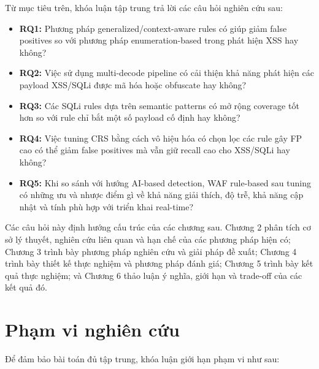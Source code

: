 Từ mục tiêu trên, khóa luận tập trung trả lời các câu hỏi nghiên cứu sau:

\begin{itemize}
    \item \textbf{RQ1:} Phương pháp generalized/context-aware rules có giúp giảm false positives so với phương pháp enumeration-based trong phát hiện XSS hay không?

    \item \textbf{RQ2:} Việc sử dụng multi-decode pipeline có cải thiện khả năng phát hiện các payload XSS/SQLi được mã hóa hoặc obfuscate hay không?

    \item \textbf{RQ3:} Các SQLi rules dựa trên semantic patterns có mở rộng coverage tốt hơn so với rule chỉ bắt một số payload cố định hay không?

    \item \textbf{RQ4:} Việc tuning CRS bằng cách vô hiệu hóa có chọn lọc các rule gây FP cao có thể giảm false positives mà vẫn giữ recall cao cho XSS/SQLi hay không?

    \item \textbf{RQ5:} Khi so sánh với hướng AI-based detection, WAF rule-based sau tuning có những ưu và nhược điểm gì về khả năng giải thích, độ trễ, khả năng cập nhật và tính phù hợp với triển khai real-time?
\end{itemize}

Các câu hỏi này định hướng cấu trúc của các chương sau. Chương 2 phân tích cơ sở lý thuyết, nghiên cứu liên quan và hạn chế của các phương pháp hiện có; Chương 3 trình bày phương pháp nghiên cứu và giải pháp đề xuất; Chương 4 trình bày thiết kế thực nghiệm và phương pháp đánh giá; Chương 5 trình bày kết quả thực nghiệm; và Chương 6 thảo luận ý nghĩa, giới hạn và trade-off của các kết quả đó.

\section{Phạm vi nghiên cứu}
\label{sec:scope}

Để đảm bảo bài toán đủ tập trung, khóa luận giới hạn phạm vi như sau:

